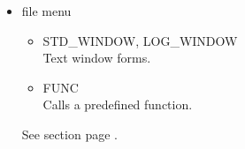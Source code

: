 \begin{enumerate}
\begin{itemize}
  \end{itemize}
 \begin{itemize}
  \item file menu \\
    \begin{itemize}
    \item STD\_WINDOW, LOG\_WINDOW \\
    Text window forms. \\
    \item FUNC \\
    Calls a predefined function. \\
  \end{itemize}
  See section  page \pageref{uifilemenu}. \\
 \end{itemize}
\end{enumerate}
